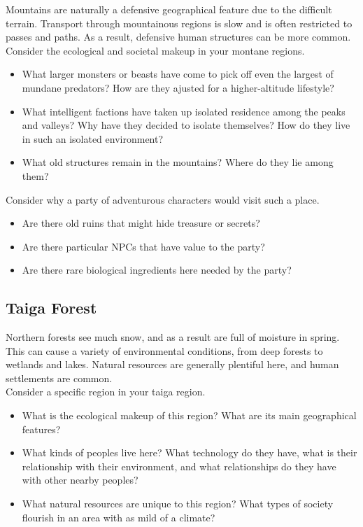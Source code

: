 \documentclass[notitlepage]{article}
\begin{document}
\begin{multicols}{2}
Mountains are naturally a defensive geographical feature due to the difficult terrain. Transport through mountainous regions is slow and is often restricted to passes and paths. As a result, defensive human structures can be more common. \\

Consider the ecological and societal makeup in your montane regions.

\begin{itemize}
\item What larger monsters or beasts have come to pick off even the largest of mundane predators? How are they ajusted for a higher-altitude lifestyle?
\item What intelligent factions have taken up isolated residence among the peaks and valleys? Why have they decided to isolate themselves? How do they live in such an isolated environment?
\item What old structures remain in the mountains? Where do they lie among them?
\end{itemize}

Consider why a party of adventurous characters would visit such a place.

\begin{itemize}
\item Are there old ruins that might hide treasure or secrets?
\item Are there particular NPCs that have value to the party?
\item Are there rare biological ingredients here needed by the party?
\end{itemize}



\subsection*{Taiga Forest}

Northern forests see much snow, and as a result are full of moisture in spring. This can cause a variety of environmental conditions, from deep forests to wetlands and lakes. Natural resources are generally plentiful here, and human settlements are common. \\

Consider a specific region in your taiga region.

\begin{itemize}
\item What is the ecological makeup of this region? What are its main geographical features?
\item What kinds of peoples live here? What technology do they have, what is their relationship with their environment, and what relationships do they have with other nearby peoples?
\item What natural resources are unique to this region? What types of society flourish in an area with as mild of a climate?
\end{itemize}


\end{multicols}
\end{document}
